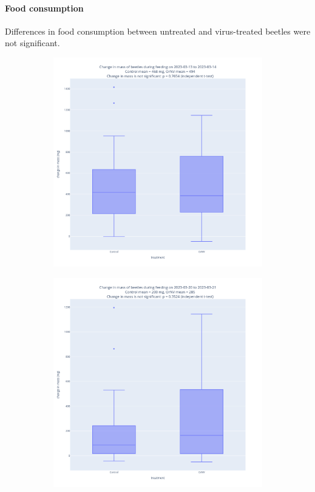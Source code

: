 \documentclass[12pt,letterpaper,english,bibliography=totocnumbered, abstract=on]{scrartcl}
\begin{document}
\clearpage
\paragraph{Food consumption}

Differences in food consumption between untreated and virus-treated beetles were not significant.

\begin{figure}[H]
	\centering
	\begin{subfigure}{.49\textwidth}
		\includegraphics[width=\linewidth]{images/food_consumption_2023-03-13}
	\end{subfigure}
	\begin{subfigure}{.49\textwidth}
		\includegraphics[width=\textwidth]{images/food_consumption_2023-03-20}

\end{subfigure}
\end{figure}
\end{document}
